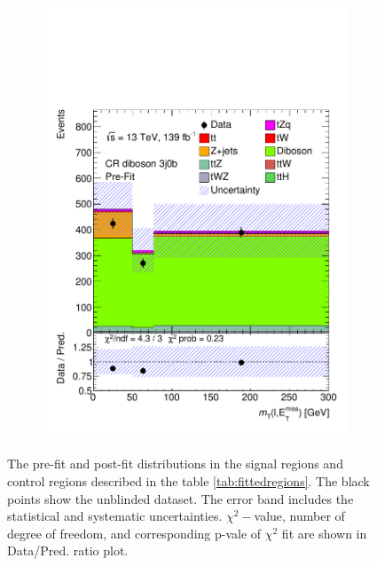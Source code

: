 \begin{figure}[!h]
\begin{subfigure}[b]{0.33\linewidth}
    \includegraphics[width=\textwidth]{ubonn-thesis/Chapters/Chapters_07/Figure/Data/CR_3j0b.pdf} 
  \end{subfigure} 
  \caption{ The pre-fit and post-fit distributions in the signal regions and control regions described in the table \ref{tab:fittedregions}. The black points show the unblinded dataset. The error band includes the statistical and systematic uncertainties. $\chi^{2}-$value, number of degree of freedom, and corresponding p-vale of $\chi^{2}$ fit are shown in Data/Pred. ratio  plot.}
  \label{fig:datafit1}
\end{figure}

